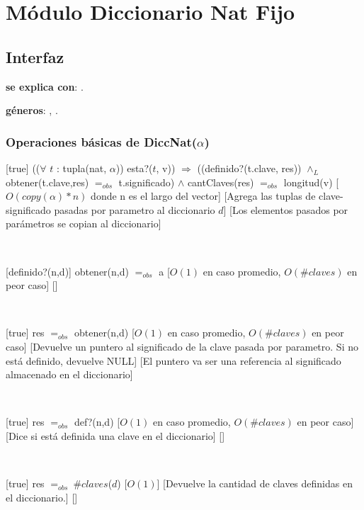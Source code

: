 \section{Módulo Diccionario Nat Fijo}

\subsection{Interfaz}

\textbf{se explica con}: .

\textbf{géneros}: , .

\subsubsection{Operaciones básicas de DiccNat($\alpha$)}

[true]
{(($\forall$ $t$ : tupla(nat, $\alpha$)) esta?($t$, v)) $\Rightarrow$ ((definido?(t.clave, res))
	$\land_L$ obtener(t.clave,res) $=_{obs}$ t.significado) $\land$ cantClaves(res) $=_{obs}$ longitud(v)}
[$O(copy(\alpha) * n)$ donde n es el largo del vector]
[Agrega las tuplas de clave-significado pasadas por parametro al diccionario $d$]
[Los elementos pasados por parámetros se copian al diccionario]

~

[definido?(n,d)]
{obtener(n,d) $=_{obs}$ a}
[$O(1)$ en caso promedio, $O(\# claves)$ en peor caso]
[]

~

[true]
{res $=_{obs}$ obtener(n,d)}
[$O(1)$ en caso promedio, $O(\# claves)$ en peor caso]
[Devuelve un puntero al significado de la clave pasada por parametro. Si no está definido, devuelve NULL]
[El puntero va ser una referencia al significado almacenado en el diccionario]

~

[true]
{res $=_{obs}$ def?(n,d)}
[$O(1)$ en caso promedio, $O(\# claves)$ en peor caso]
[Dice si está definida una clave en el diccionario]
[]

~

[true]
{res $=_{obs} \ \# claves$($d$)}
[$O(1)$]
[Devuelve la cantidad de claves definidas en el diccionario.]
[]

